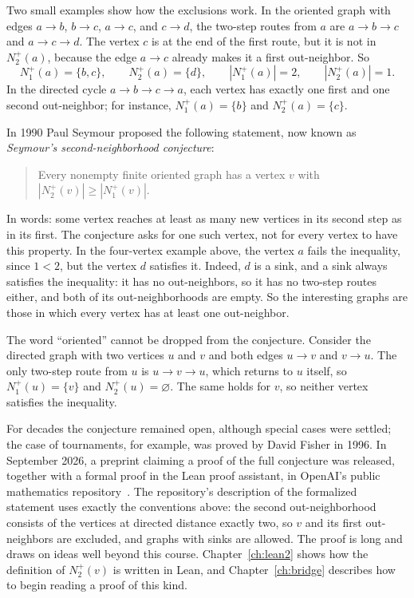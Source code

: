 Two small examples show how the exclusions work. In the oriented graph with edges $a\to b$, $b\to c$, $a\to c$, and $c\to d$, the two-step routes from $a$ are $a\to b\to c$ and $a\to c\to d$. The vertex $c$ is at the end of the first route, but it is not in $N_2^+(a)$, because the edge $a\to c$ already makes it a first out-neighbor. So
\[
N_1^+(a)=\{b,c\},\qquad N_2^+(a)=\{d\},\qquad |N_1^+(a)|=2,\qquad |N_2^+(a)|=1.
\]
In the directed cycle $a\to b\to c\to a$, each vertex has exactly one first and one second out-neighbor; for instance, $N_1^+(a)=\{b\}$ and $N_2^+(a)=\{c\}$.

In 1990 Paul Seymour proposed the following statement, now known as \emph{Seymour's second-neighborhood conjecture}:
\begin{quote}
Every nonempty finite oriented graph has a vertex $v$ with $|N_2^+(v)|\ge|N_1^+(v)|$.
\end{quote}
In words: some vertex reaches at least as many new vertices in its second step as in its first. The conjecture asks for one such vertex, not for every vertex to have this property. In the four-vertex example above, the vertex $a$ fails the inequality, since $1<2$, but the vertex $d$ satisfies it. Indeed, $d$ is a sink, and a sink always satisfies the inequality: it has no out-neighbors, so it has no two-step routes either, and both of its out-neighborhoods are empty. So the interesting graphs are those in which every vertex has at least one out-neighbor.

The word ``oriented'' cannot be dropped from the conjecture. Consider the directed graph with two vertices $u$ and $v$ and both edges $u\to v$ and $v\to u$. The only two-step route from $u$ is $u\to v\to u$, which returns to $u$ itself, so $N_1^+(u)=\{v\}$ and $N_2^+(u)=\varnothing$. The same holds for $v$, so neither vertex satisfies the inequality.

For decades the conjecture remained open, although special cases were settled; the case of tournaments, for example, was proved by David Fisher in 1996. In September 2026, a preprint claiming a proof of the full conjecture was released, together with a formal proof in the Lean proof assistant, in OpenAI's public mathematics repository~\cite{oai173}. The repository's description of the formalized statement uses exactly the conventions above: the second out-neighborhood consists of the vertices at directed distance exactly two, so $v$ and its first out-neighbors are excluded, and graphs with sinks are allowed. The proof is long and draws on ideas well beyond this course. Chapter~\ref{ch:lean2} shows how the definition of $N_2^+(v)$ is written in Lean, and Chapter~\ref{ch:bridge} describes how to begin reading a proof of this kind.

